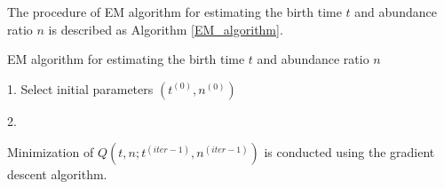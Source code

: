 \documentclass{article}
\begin{document}
The procedure of EM algorithm for estimating the birth time $t$ and abundance ratio $n$ is described as Algorithm \ref{EM_algorithm}.
 \begin{algorithm}
 \caption{EM algorithm for estimating the birth time $t$ and abundance ratio $n$}
  \label{EM_algorithm}
 1. Select initial parameters $(t^{(0)}, n^{(0)})$ %
 
 2. 
 \end{algorithm}

Minimization of $Q(t,n; t^{(iter-1)},n^{(iter-1)})$ is conducted using the gradient descent algorithm.

\end{document}
